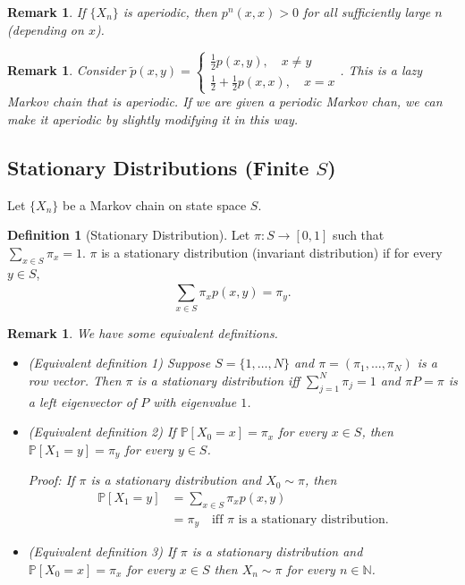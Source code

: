 \documentclass{tufte-handout}
\newcommand*\N{\mathbb{N}}
\renewcommand*\P{\mathbb{P}}
\newtheorem{rmk}[thm]{Remark}
\theoremstyle{definition}
\newtheorem{defn}[thm]{Definition}
\begin{document}
\begin{rmk}
	If $\{X_n\}$ is aperiodic, then $p^n(x,x) > 0$ for all sufficiently large $n$ (depending on $x$).
\end{rmk}

\begin{rmk}
	Consider $\tilde{p}(x,y) = \begin{cases}
		\frac{1}{2} p(x,y), \quad x \ne y \\
		\frac{1}{2} + \frac{1}{2}p(x,x), \quad x=x
	\end{cases}$. This is a lazy Markov chain that is aperiodic. If we are given a periodic Markov chan, we can make it aperiodic by slightly modifying it in this way.
\end{rmk}

\subsection{Stationary Distributions (Finite $S$)}

Let $\{X_n\}$ be a Markov chain on state space $S$.

\begin{defn}[Stationary Distribution]
	Let $\pi: S \to [0,1]$ such that $\sum\limits_{x \in S}^{} \pi_x = 1$. $\pi$ is a stationary distribution (invariant distribution) if for every $y \in S$, \[
		\sum\limits_{x \in S}^{} \pi_x p(x,y) = \pi_y
	.\] 

\end{defn}

\begin{rmk}
We have some equivalent definitions.
	\begin{itemize}
		\item (Equivalent definition 1) Suppose $S = \{1,\ldots,N\}$ and $\pi = (\pi_1,\ldots,\pi_N)$ is a row vector. Then $\pi$ is a stationary distribution iff $\sum\limits_{j=1}^{N} \pi_j = 1$ and $\pi P = \pi$ is a left eigenvector of $P$ with eigenvalue $1$.


		\item (Equivalent definition 2) If $\P\left[X_0 = x\right] = \pi_x$ for every $x \in S$, then $\P\left[X_1 = y\right] = \pi_y$ for every $y \in S$.

		Proof: If $\pi$ is a stationary distribution and $X_0 \sim \pi$, then 
			\begin{align*}
				\P\left[X_1 = y\right]  &= \sum\limits_{x \in S}^{} \pi_x p(x,y) \\
										&= \pi_y \quad \text{iff $\pi$ is a stationary distribution}
			.\end{align*}

		\item (Equivalent definition 3) If $\pi$ is a stationary distribution and $\P\left[X_0 = x\right] = \pi_x$ for every $x \in S$ then $X_n \sim \pi$ for every $n \in \N$.
	\end{itemize}
\end{rmk}
\end{document}
